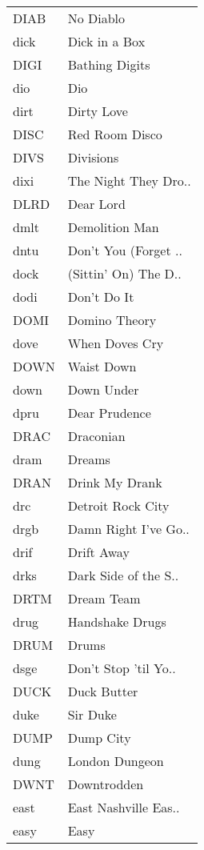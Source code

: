 \begin{supertabular}{ll}
 DIAB &             No Diablo \\
 dick &         Dick in a Box \\
 DIGI &        Bathing Digits \\
  dio &                   Dio \\
 dirt &            Dirty Love \\
 DISC &        Red Room Disco \\
 DIVS &             Divisions \\
 dixi &  The Night They Dro.. \\
 DLRD &             Dear Lord \\
 dmlt &        Demolition Man \\
 dntu &  Don't You (Forget .. \\
 dock &  (Sittin' On) The D.. \\
 dodi &           Don't Do It \\
 DOMI &         Domino Theory \\
 dove &        When Doves Cry \\
 DOWN &            Waist Down \\
 down &            Down Under \\
 dpru &         Dear Prudence \\
 DRAC &             Draconian \\
 dram &                Dreams \\
 DRAN &        Drink My Drank \\
  drc &     Detroit Rock City \\
 drgb &  Damn Right I've Go.. \\
 drif &            Drift Away \\
 drks &  Dark Side of the S.. \\
 DRTM &            Dream Team \\
 drug &       Handshake Drugs \\
 DRUM &                 Drums \\
 dsge &  Don't Stop 'til Yo.. \\
 DUCK &           Duck Butter \\
 duke &              Sir Duke \\
 DUMP &             Dump City \\
 dung &        London Dungeon \\
 DWNT &           Downtrodden \\
 east &  East Nashville Eas.. \\
 easy &                  Easy \\

\end{supertabular}
